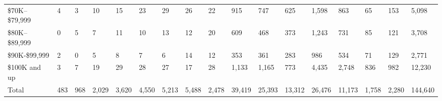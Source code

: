 \documentclass{article}
\begin{document}
\begin{landscape}
\begin{table}[h]
\begin{tabular}{|l|lllllllllllllll|l|}
\$70K--\$79,999 & 4                                          & 3                                   & 10                                 & 15                                 & 23                               & 29                                & 26                                & 22                                & 915                              & 747                                   & 625                              & 1,598                            & 863                              & 65                                  & 153          & 5,098   \\ \cline{1-1} \cline{17-17} 
\$80K--\$89,999 & 0                                          & 5                                   & 7                                  & 11                                 & 10                               & 13                                & 12                                & 20                                & 609                              & 468                                   & 373                              & 1,243                            & 731                              & 85                                  & 121          & 3,708   \\ \cline{1-1} \cline{17-17} 
\$90K-\$99,999 & 2                                          & 0                                   & 5                                  & 8                                  & 7                                & 6                                 & 14                                & 12                                & 353                              & 361                                   & 283                              & 986                              & 534                              & 71                                  & 129          & 2,771   \\ \cline{1-1} \cline{17-17} 
\$100K and up   & 3                                          & 7                                   & 19                                 & 29                                 & 28                               & 27                                & 17                                & 28                                & 1,133                            & 1,165                                 & 773                              & 4,435                            & 2,748                            & 836                                 & 982          & 12,230  \\ \hline
Total              & \multicolumn{1}{l|}{483}                   & \multicolumn{1}{l|}{968}            & \multicolumn{1}{l|}{2,029}         & \multicolumn{1}{l|}{3,620}         & \multicolumn{1}{l|}{4,550}       & \multicolumn{1}{l|}{5,213}        & \multicolumn{1}{l|}{5,488}        & \multicolumn{1}{l|}{2,478}        & \multicolumn{1}{l|}{39,419}      & \multicolumn{1}{l|}{25,393}           & \multicolumn{1}{l|}{13,312}      & \multicolumn{1}{l|}{26,476}      & \multicolumn{1}{l|}{11,173}      & \multicolumn{1}{l|}{1,758}          & 2,280        & 144,640 \\ \hline
\end{tabular}
\end{table}


\end{landscape}
\end{document}
